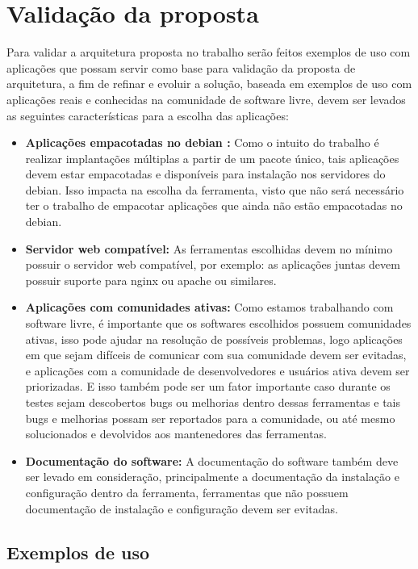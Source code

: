\section{Validação da proposta}

Para validar a arquitetura proposta no trabalho serão feitos exemplos de uso com aplicações
que possam servir como base para validação da proposta de arquitetura, a fim de
refinar e evoluir a solução, baseada em exemplos de uso com aplicações reais e conhecidas
na comunidade de software livre, devem ser levados as seguintes características para a
escolha das aplicações:

\begin{itemize}
  \item  \textbf{Aplicações empacotadas no debian :}  Como o intuito do trabalho
  é realizar implantações múltiplas a partir de um pacote único, tais aplicações
  devem estar empacotadas e disponíveis para instalação nos servidores do debian.
  Isso impacta na escolha da ferramenta, visto que não será necessário ter o trabalho
  de empacotar aplicações que ainda não estão empacotadas no debian.
  \item  \textbf{Servidor web compatível:} As ferramentas escolhidas devem no
  mínimo possuir o servidor web compatível, por exemplo: as aplicações juntas
  devem possuir suporte para nginx ou apache ou similares.
  \item  \textbf{Aplicações com comunidades ativas:} Como estamos trabalhando
  com software livre, é importante que os softwares escolhidos possuem comunidades
  ativas, isso pode ajudar na resolução de  possíveis problemas, logo aplicações
  em que sejam difíceis de comunicar com sua comunidade devem ser evitadas, e
  aplicações com a comunidade de desenvolvedores e usuários ativa devem ser priorizadas.
  E isso também pode ser um fator importante caso durante os testes sejam descobertos
  bugs ou melhorias dentro dessas ferramentas e tais bugs e melhorias possam ser
  reportados para a comunidade, ou até mesmo solucionados e devolvidos aos mantenedores
  das ferramentas.
  \item  \textbf{Documentação do software:} A documentação do software também deve
  ser levado em consideração, principalmente a documentação da instalação e configuração
  dentro da ferramenta, ferramentas que não possuem documentação de instalação e
  configuração devem ser evitadas.
\end{itemize}

\subsection{Exemplos de uso}

